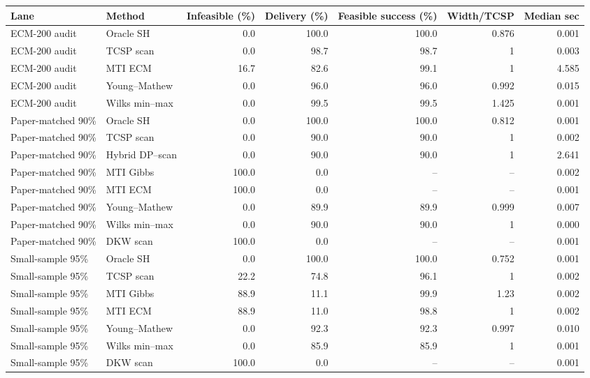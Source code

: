 \begin{tabularx}{\textwidth}{@{}l>{\raggedright\arraybackslash}Xrrrrr@{}}
\toprule
Lane & Method & Infeasible (\%) & Delivery (\%) & Feasible success (\%) & Width/TCSP & Median sec\\
\midrule
ECM-200 audit & Oracle SH & 0.0 & 100.0 & 100.0 & 0.876 & 0.001 \\
ECM-200 audit & TCSP scan & 0.0 & 98.7 & 98.7 & 1 & 0.003 \\
ECM-200 audit & MTI ECM & 16.7 & 82.6 & 99.1 & 1 & 4.585 \\
ECM-200 audit & Young--Mathew & 0.0 & 96.0 & 96.0 & 0.992 & 0.015 \\
ECM-200 audit & Wilks min--max & 0.0 & 99.5 & 99.5 & 1.425 & 0.001 \\
Paper-matched 90\% & Oracle SH & 0.0 & 100.0 & 100.0 & 0.812 & 0.001 \\
Paper-matched 90\% & TCSP scan & 0.0 & 90.0 & 90.0 & 1 & 0.002 \\
Paper-matched 90\% & Hybrid DP--scan & 0.0 & 90.0 & 90.0 & 1 & 2.641 \\
Paper-matched 90\% & MTI Gibbs & 100.0 & 0.0 & -- & -- & 0.002 \\
Paper-matched 90\% & MTI ECM & 100.0 & 0.0 & -- & -- & 0.001 \\
Paper-matched 90\% & Young--Mathew & 0.0 & 89.9 & 89.9 & 0.999 & 0.007 \\
Paper-matched 90\% & Wilks min--max & 0.0 & 90.0 & 90.0 & 1 & 0.000 \\
Paper-matched 90\% & DKW scan & 100.0 & 0.0 & -- & -- & 0.001 \\
Small-sample 95\% & Oracle SH & 0.0 & 100.0 & 100.0 & 0.752 & 0.001 \\
Small-sample 95\% & TCSP scan & 22.2 & 74.8 & 96.1 & 1 & 0.002 \\
Small-sample 95\% & MTI Gibbs & 88.9 & 11.1 & 99.9 & 1.23 & 0.002 \\
Small-sample 95\% & MTI ECM & 88.9 & 11.0 & 98.8 & 1 & 0.002 \\
Small-sample 95\% & Young--Mathew & 0.0 & 92.3 & 92.3 & 0.997 & 0.010 \\
Small-sample 95\% & Wilks min--max & 0.0 & 85.9 & 85.9 & 1 & 0.001 \\
Small-sample 95\% & DKW scan & 100.0 & 0.0 & -- & -- & 0.001 \\
\bottomrule
\end{tabularx}
